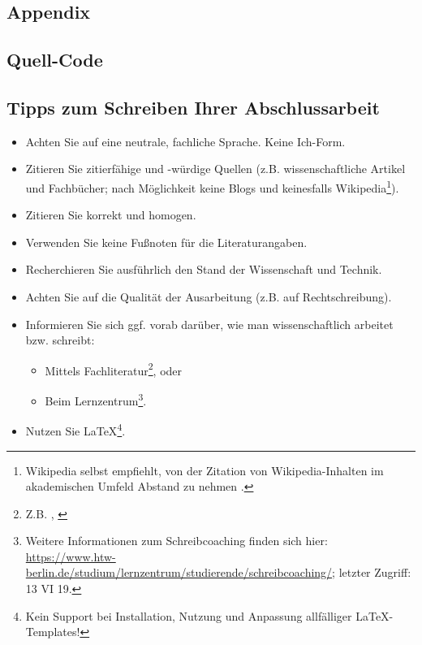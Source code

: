 \begin{appendix}


    \chapter{Appendix}


    \section{Quell-Code}

    \section{Tipps zum Schreiben Ihrer Abschlussarbeit}

    \begin{itemize}
        \item Achten Sie auf eine neutrale, fachliche Sprache. Keine \glqq{}Ich\grqq{}-Form.
        \item Zitieren Sie zitierf\"ahige und -w\"urdige Quellen (z.B. wissenschaftliche Artikel und Fachb\"ucher; nach M\"oglichkeit keine Blogs und keinesfalls Wikipedia\footnote{Wikipedia selbst empfiehlt, von der Zitation von Wikipedia-Inhalten im akademischen Umfeld Abstand zu nehmen \autocite{wikipedia2019}.}).
        \item Zitieren Sie korrekt und homogen.
        \item Verwenden Sie keine Fu{\ss}noten f\"ur die Literaturangaben.
        \item Recherchieren Sie ausf\"uhrlich den Stand der Wissenschaft und Technik.
        \item Achten Sie auf die Qualit\"at der Ausarbeitung (z.B. auf Rechtschreibung).
        \item Informieren Sie sich ggf. vorab dar\"uber, wie man wissenschaftlich arbeitet bzw. schreibt:
              \begin{itemize}
                  \item Mittels Fachliteratur\footnote{Z.B. \autocite{balzert2011}, \autocite{franck2013}}, oder
                  \item Beim Lernzentrum\footnote{Weitere Informationen zum Schreibcoaching finden sich hier: \url{https://www.htw-berlin.de/studium/lernzentrum/studierende/schreibcoaching/}; letzter Zugriff: 13 VI 19.}.
              \end{itemize}
        \item Nutzen Sie \LaTeX\footnote{Kein Support bei Installation, Nutzung und Anpassung allf\"alliger \LaTeX-Templates!}.
    \end{itemize}




\end{appendix}
